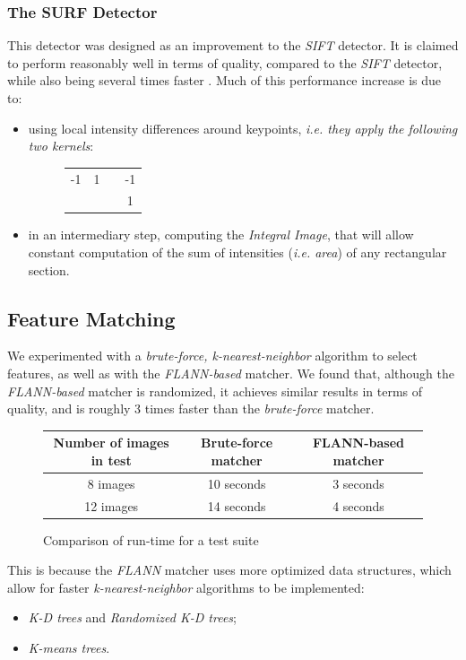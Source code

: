 \documentclass[a4paper,onecolumn,oneside,titlepage,11pt]{report}
\begin{document}
\subsubsection{The SURF Detector}
This detector was designed as an improvement to the \emph{SIFT} detector. It is claimed to perform reasonably well in terms of quality, compared to the \emph{SIFT} detector, while also being several times faster \cite{surf}. Much of this performance increase is due to:
\begin{itemize}
	\item using local intensity differences around keypoints, \emph{i.e. they apply the following two kernels}:
	\begin{figure}[H]
		\begin{center}
			\begin{tabular}{|c|c|c|c|}
				\cline{1-2}\cline{4-4}
				-1 & 1 & & -1 \\
				\cline{1-2}\cline{4-4}
				\multicolumn{3}{c|}{ } & 1 \\
				 \cline{4-4}
			\end{tabular}
		\end{center}
	\end{figure}
	\item in an intermediary step, computing the \emph{Integral Image}, that will allow constant computation of the sum of intensities (\emph{i.e. area}) of any rectangular section.
\end{itemize}

\subsection{Feature Matching}

We experimented with a \emph{brute-force, k-nearest-neighbor} algorithm to select features, as well as with the \emph{FLANN-based} matcher. We found that, although the \emph{FLANN-based} matcher is randomized, it achieves similar results in terms of quality, and is roughly 3 times faster than the \emph{brute-force} matcher.
\begin{figure}[H]
	\begin{center}
		\begin{tabular}{|c|c|c|}
			\hline
			\textbf{Number of images in test} & \textbf{Brute-force matcher} & \textbf{FLANN-based matcher}\\
			\hline
			8 images & 10 seconds & 3 seconds\\
			12 images & 14 seconds & 4 seconds\\
			\hline
		\end{tabular}
	\end{center}
	\caption{Comparison of run-time for a test suite}
\end{figure}
This is because the \emph{FLANN} matcher uses more optimized data structures, which allow for faster \emph{k-nearest-neighbor} algorithms to be implemented:
\begin{itemize}
	\item \emph{K-D trees} and \emph{Randomized K-D trees};
	\item \emph{K-means trees}.
\end{itemize}
\end{document}
